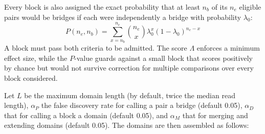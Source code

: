 \documentclass{article}
\begin{document}
Every block is also assigned the exact probability that at least $n_b$ of its $n_e$ eligible pairs would be bridges if each were independently a bridge with probability $\lambda_0$:
\begin{equation}
    P(n_e, n_b) = \sum_{x = n_b}^{n_e}{\binom{n_e}{x}\lambda_0^{x}(1 - \lambda_0)^{n_e - x}}
\end{equation}
A block must pass both criteria to be admitted.
The score $\Lambda$ enforces a minimum effect size, while the $P$-value guards against a small block that scores positively by chance but would not survive correction for multiple comparisons over every block considered.

Let $L$ be the maximum domain length (by default, twice the median read length), $\alpha_P$ the false discovery rate for calling a pair a bridge (default 0.05), $\alpha_D$ that for calling a block a domain (default 0.05), and $\alpha_M$ that for merging and extending domains (default 0.05).
The domains are then assembled as follows:
\end{document}

